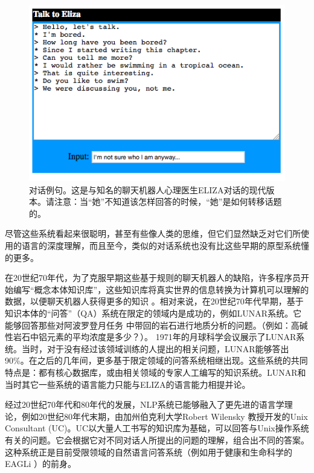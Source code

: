 \begin{figure}[htb]
\centering
\includegraphics[width=14cm]{figures/eliza.png}
\caption{ 对话例句。这是与知名的聊天机器人心理医生ELIZA对话的现代版本。请注意：当“她”不知道该怎样回答的时候，“她”是如何转移话题的。 }
\label{fig:eliza}
\end{figure}

尽管这些系统看起来很聪明，甚至有些像人类的思维，但它们显然缺乏对它们所使用的语言的深度理解，而且至今，类似的对话系统也没有比这些早期的原型系统懂的更多。

在20世纪70年代，为了克服早期这些基于规则的聊天机器人的缺陷，许多程序员开始编写“概念本体知识库”，这些知识库将真实世界的信息转换为计算机可以理解的数据，以便聊天机器人获得更多的知识 \cite{McCorduck2004}。相对来说，在20世纪70年代早期，基于知识本体的“问答”（QA）系统在限定的领域内是成功的，例如LUNAR系统。它能够回答那些对阿波罗登月任务 \cite{Woods1973} 中带回的岩石进行地质分析的问题。（例如：高碱性岩石中铝元素的平均浓度是多少？）。 1971年的月球科学会议展示了LUNAR系统。当时，对于没有经过该领域训练的人提出的相关问题，LUNAR能够答出90\%。在之后的几年间，更多基于限定领域的问答系统相继出现。这些系统的共同特点是：都有核心数据库，或由相关领域的专家人工编写的知识系统。LUNAR和当时其它一些系统的语言能力只能与ELIZA的语言能力相提并论。

经过20世纪70年代和80年代的发展，NLP系统已能够融入了更先进的语言学理论，例如20世纪80年代末期，由加州伯克利大学Robert Wilensky 教授开发的Unix Consultant (UC)\cite{Wilensky88theberkeley}。UC以大量人工书写的知识库为基础，可以回答与Unix操作系统有关的问题。它会根据它对不同对话人所提出的问题的理解，组合出不同的答案。这种系统正是目前受限领域的自然语言问答系统（例如用于健康和生命科学的EAGLi \cite{eagli}）的前身。

